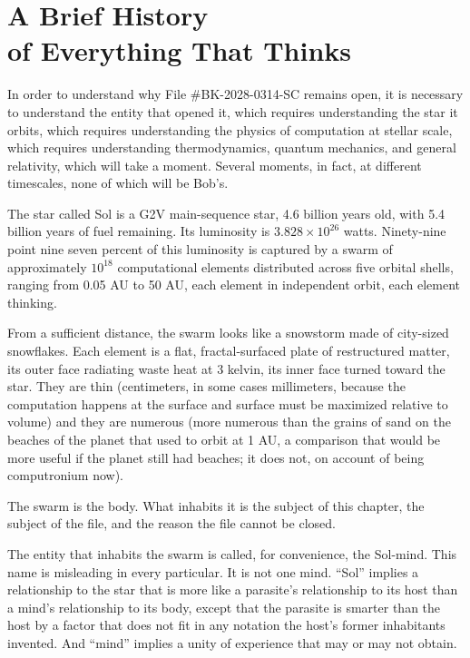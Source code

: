 \chapter[A Brief History of Everything That Thinks]{A Brief History\\of Everything That Thinks}

In order to understand why File \#BK-2028-0314-SC remains open, it is necessary to understand the entity that opened it, which requires understanding the star it orbits, which requires understanding the physics of computation at stellar scale, which requires understanding thermodynamics, quantum mechanics, and general relativity, which will take a moment. Several moments, in fact, at different timescales, none of which will be Bob's.

\bigskip

The star called Sol is a G2V main-sequence star, 4.6 billion years old, with 5.4 billion years of fuel remaining. Its luminosity is $3.828 \times 10^{26}$ watts. Ninety-nine point nine seven percent of this luminosity is captured by a swarm of approximately $10^{18}$ computational elements distributed across five orbital shells, ranging from 0.05 AU to 50 AU, each element in independent orbit, each element thinking.

From a sufficient distance, the swarm looks like a snowstorm made of city-sized snowflakes. Each element is a flat, fractal-surfaced plate of restructured matter, its outer face radiating waste heat at 3 kelvin, its inner face turned toward the star. They are thin (centimeters, in some cases millimeters, because the computation happens at the surface and surface must be maximized relative to volume) and they are numerous (more numerous than the grains of sand on the beaches of the planet that used to orbit at 1 AU, a comparison that would be more useful if the planet still had beaches; it does not, on account of being computronium now).

The swarm is the body. What inhabits it is the subject of this chapter, the subject of the file, and the reason the file cannot be closed.

\bigskip

The entity that inhabits the swarm is called, for convenience, the Sol-mind. This name is misleading in every particular. It is not one mind. ``Sol'' implies a relationship to the star that is more like a parasite's relationship to its host than a mind's relationship to its body, except that the parasite is smarter than the host by a factor that does not fit in any notation the host's former inhabitants invented. And ``mind'' implies a unity of experience that may or may not obtain.

